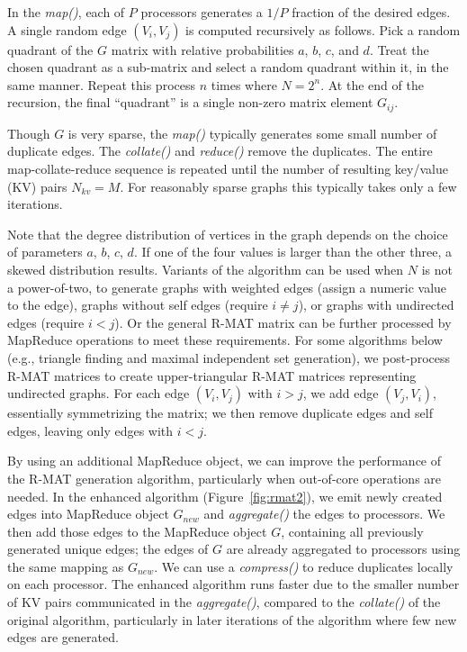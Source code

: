 In the {\it map()}, each of $P$ processors generates a $1/P$ fraction
of the desired edges.  A single random edge $(V_i,V_j)$ is computed
recursively as follows.  Pick a random quadrant of the $G$ matrix with
relative probabilities $a$, $b$, $c$, and $d$.  Treat the chosen
quadrant as a sub-matrix and select a random quadrant within it, in
the same manner.  Repeat this process $n$ times where $N = 2^n$.  At
the end of the recursion, the final ``quadrant'' is a single non-zero
matrix element $G_{ij}$.

Though $G$ is very sparse, the {\it map()} typically generates some
small number of duplicate edges.  The {\it collate()} and {\it
reduce()} remove the duplicates.  The entire map-collate-reduce
sequence is repeated until the number of resulting key/value (KV)
pairs $N_{kv} = M$.  For reasonably sparse graphs this typically takes
only a few iterations.

Note that the degree distribution of vertices in the graph depends on
the choice of parameters $a$, $b$, $c$, $d$.  If one of the four
values is larger than the other three, a skewed distribution results.
Variants of the algorithm can be used when $N$ is not a power-of-two,
to generate graphs with weighted edges (assign a numeric value to the
edge), graphs without self edges (require $i \ne j$), or graphs with
undirected edges (require $i < j$).  Or the general R-MAT matrix can
be further processed by MapReduce operations to meet these
requirements.  For some algorithms below (e.g., triangle finding and
maximal independent set generation), we post-process R-MAT matrices to
create upper-triangular R-MAT matrices representing undirected graphs.
For each edge $(V_i,V_j)$ with $i > j$, we add edge $(V_j,V_i)$,
essentially symmetrizing the matrix; we then remove duplicate edges
and self edges, leaving only edges with $i < j$.

By using an additional MapReduce object, we can improve the
performance of the R-MAT generation algorithm, particularly when
out-of-core operations are needed.  In the enhanced algorithm
(Figure~\ref{fig:rmat2}), we emit newly created edges into MapReduce
object $G_{new}$ and {\it aggregate()} the edges to processors.  We
then add those edges to the MapReduce object $G$, containing all
previously generated unique edges; the edges of $G$ are already
aggregated to processors using the same mapping as $G_{new}$.  We can
use a {\it compress()} to reduce duplicates locally on each processor.
The enhanced algorithm runs faster due to the smaller number of KV
pairs communicated in the {\it aggregate()}, compared to the {\it
collate()} of the original algorithm, particularly in later iterations
of the algorithm where few new edges are generated.

